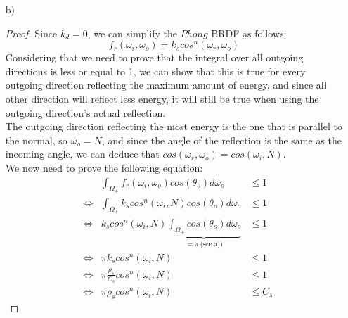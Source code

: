 \documentclass{article}
\begin{document}
\begin{enumerate}[label=(\alph*)]
\begin{proof}
\begin{align}
        &\Leftrightarrow & \pi {\rho}_d &\leq C_d
    \end{align}
    \textbf{Remarks:}
    \begin{itemize}
        \item To compute the integral over the upper hemisphere $\Omega_+$, we rewrite the integral in (3) as double integral of the two polar coordinates $\phi$ and $\theta$ (Lecture 5, slide 13).
        \item Computing the integral of a product of trigonometric functions is evil and we only want to have a sinus function, so we use the trigonometric identity in (4): $cos(\alpha)sin(\alpha) = \frac{1}{2} sin(2\alpha)$
    \end{itemize}
    \end{proof}
    \item[b)]
    \begin{proof}
     Since $k_d=0$, we can simplify the $Phong$ BRDF as follows:\\
    $$f_r({\omega}_i, {\omega}_o) = k_s cos^n({\omega}_r, {\omega}_o)$$
    Considering that we need to prove that the integral over all outgoing directions is less or equal to 1, we can show that this is true for every outgoing direction reflecting the maximum amount of energy, and since all other direction will reflect less energy, it will still be true when using the outgoing direction's actual reflection.\\
    The outgoing direction reflecting the most energy is the one that is parallel to the normal, so ${\omega}_o = N$, and since the angle of the reflection is the same as the incoming angle, we can deduce that $cos({\omega}_r, {\omega}_o) = cos({\omega}_i, N)$.\\
    We now need to prove the following equation:
    \begin{align}
        & & \int_{\Omega_+} f_r({\omega}_i, {\omega}_o)cos({\theta}_o) d{\omega}_o &\leq 1\\ 
        &\Leftrightarrow & \int_{\Omega_+} k_s cos^n({\omega}_i, N) cos({\theta}_o) d{\omega}_o &\leq 1\\
        &\Leftrightarrow & k_s cos^n({\omega}_i, N) \underbrace{\int_{\Omega_+}  cos({\theta}_o) d{\omega}_o}_{= \pi\ \text{(see a))}} &\leq 1\\
        &\Leftrightarrow & \pi k_s cos^n({\omega}_i, N) &\leq 1\\
        &\Leftrightarrow & \pi \frac{{\rho}_s}{C_s} cos^n({\omega}_i, N) &\leq 1\\
        &\Leftrightarrow & \pi \rho_s cos^n({\omega}_i, N) &\leq C_s

\end{align}
\end{proof}
\end{enumerate}
\end{document}
